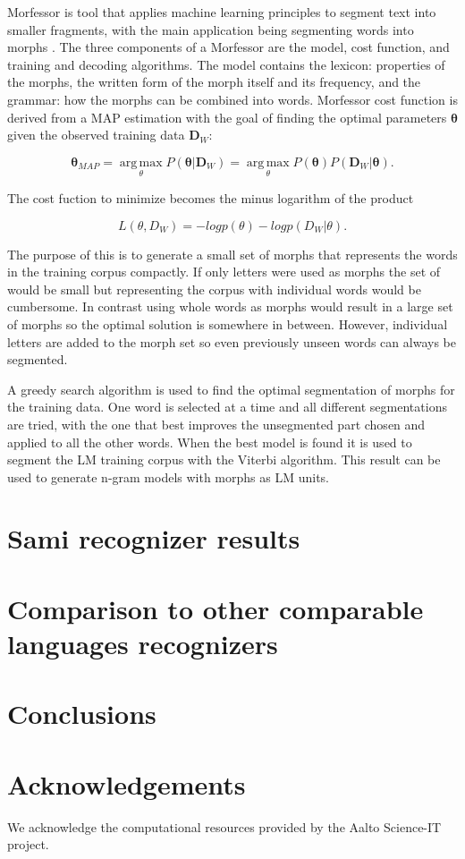 \documentclass[10pt,b5paper,utf8]{article}
\begin{document}
Morfessor is tool that applies machine learning principles to segment text into smaller fragments, with the main application being segmenting words into morphs \cite{creutz2007unsupervised}. The three components of a Morfessor are the model, cost function, and training and decoding algorithms. The model contains the lexicon: properties of the morphs, the written form of the morph itself and its frequency, and the grammar: how the morphs can be combined into words. Morfessor cost function is derived from a MAP estimation with the goal of finding the optimal parameters $\bm{\theta}$ given the observed training data $\bm{D}_W$:

\begin{equation}
\bm{\theta}_{MAP}=\operatorname*{arg\,max}_{\theta}P(\bm{\theta}|\bm{D}_W)=\operatorname*{arg\,max}_{\theta}P(\bm{\theta})P(\bm{D}_W|\bm{\theta}).
\end{equation}

The cost fuction to minimize becomes the minus logarithm of the product

\begin{equation}
L(\theta, D_W)=-log p(\theta)-log p(D_W|\theta).
\end{equation}

The purpose of this is to generate a small set of morphs that represents the words in the training corpus compactly. If only letters were used as morphs the set of would be small but representing the corpus with individual words would be cumbersome. In contrast using whole words as morphs would result in a large set of morphs so the optimal solution is somewhere in between. However, individual letters are added to the morph set so even previously unseen words can always be segmented.

A greedy search algorithm is used to find the optimal segmentation of morphs for the training data. One word is selected at a time and all different segmentations are tried, with the one that best improves the unsegmented part chosen and applied to all the other words. When the best model is found it is used to segment the LM training corpus with the Viterbi algorithm. This result can be used to generate n-gram models with morphs as LM units.

\section{Sami recognizer results} 

\section{Comparison to other comparable languages recognizers}

\section{Conclusions} 

\section{Acknowledgements} 
We acknowledge the computational resources provided by the Aalto Science-IT project.



 
\end{document}
